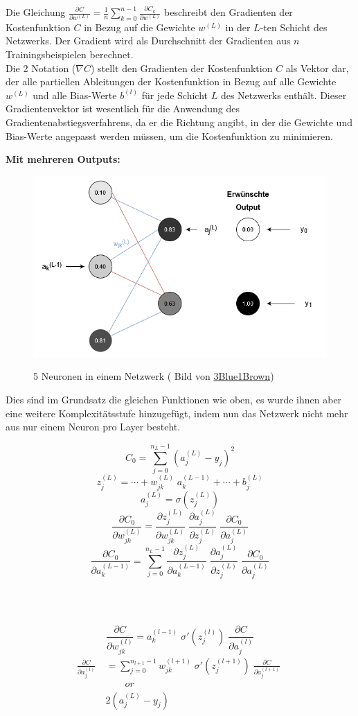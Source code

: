 \noindent Die Gleichung $\frac{\partial C}{\partial w^{(L)}} = \frac{1}{n}\sum_{k=0}^{n-1} \frac{\partial C_{k}}{\partial w^{(L)}}$ beschreibt den Gradienten der Kostenfunktion $C$ in Bezug auf die Gewichte $w^{(L)}$ in der $L$-ten Schicht des Netzwerks. Der Gradient wird als Durchschnitt der Gradienten aus $n$ Trainingsbeispielen berechnet.
\\
\noindent Die 2 Notation ($\nabla C$) stellt den Gradienten der Kostenfunktion $C$ als Vektor dar, der alle partiellen Ableitungen der Kostenfunktion in Bezug auf alle Gewichte $w^{(L)}$ und alle Bias-Werte $b^{(l)}$ für jede Schicht $L$ des Netzwerks enthält. Dieser Gradientenvektor ist wesentlich für die Anwendung des Gradientenabstiegsverfahrens, da er die Richtung angibt, in der die Gewichte und Bias-Werte angepasst werden müssen, um die Kostenfunktion zu minimieren.

\noindent\textbf{Mit mehreren Outputs:}

\begin{figure}[H]
	\centering
		\includegraphics[width=0.75\linewidth]{images/nn5bp.png}
	\label{fig:nn5bp}
	\caption{5 Neuronen in einem Netzwerk ( Bild von \href{https://www.youtube.com/watch?v=tIeHLnjs5U8}{3Blue1Brown})}
\end{figure}

\noindent Dies sind im Grundsatz die gleichen Funktionen wie oben, es wurde ihnen aber eine weitere Komplexitätsstufe hinzugefügt, indem nun das Netzwerk nicht mehr aus nur einem Neuron pro Layer besteht.

\[C_0 = \sum_{j=0}^{n_{L}-1} (a_j^{(L)} - y_j)^2\]
\[z_j^{(L)} = \cdots + w_{jk}^{(L)}\; a_k^{(L-1)} + \cdots + b_j^{(L)}\]
\[a_j^{(L)} = \sigma(z_j^{(L)})\]
\[\frac{\partial C_0}{\partial w_{jk}^{(L)}} = \frac{\partial z_j^{(L)}}{\partial w_{jk}^{(L)}}\; \frac{\partial a_j^{(L)}}{\partial z_j^{(L)}}\; \frac{\partial C_0}{\partial a_j^{(L)}}\]
\[\frac{\partial C_0}{\partial a_k^{(L-1)}} = \sum_{j=0}^{n_{L} - 1} \frac{\partial z_j^{(L)}}{\partial a_k^{(L-1)}}\; \frac{\partial a_j^{(L)}}{\partial z_j^{(L)}}\; \frac{\partial C_0}{\partial a_j^{(L)}}\]

\mbox{}\\\

\[\frac{\partial C}{\partial w_{jk}^{(l)}} = a_k^{(l-1)}\; \sigma '(z_j^{(l)})\; \frac{\partial C}{\partial a_j^{(l)}}\]
\[
\begin{split}
\frac{\partial C}{\partial a_j^{(l)}}\  & = \sum_{j=0}^{n_{l+1}-1} w_{jk}^{(l+1)}\; \sigma '(z_j^{(l+1)})\; \frac{\partial C}{\partial a_j^{(l+1)}}\; \\
&\qquad or \\
& 2(a_j^{(L)}-y_j)
\end{split}
\]